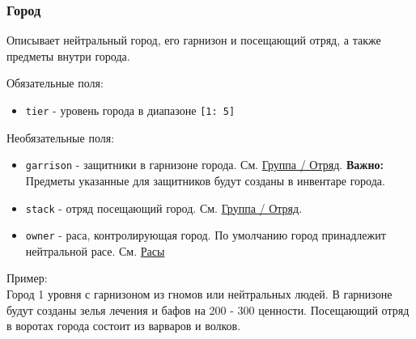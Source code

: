 \subsubsection{Город}
\label{city}
Описывает нейтральный город, его гарнизон и посещающий отряд, а также предметы внутри города.

Обязательные поля:
\begin{itemize}
\item \texttt{tier} - уровень города в диапазоне \texttt{[1: 5]}
\end{itemize}

Необязательные поля:
\begin{itemize}
\item \texttt{garrison} - защитники в гарнизоне города. См. \hyperref[group]{Группа / Отряд}. \textbf{Важно:} Предметы указанные для защитников будут созданы в инвентаре города.
\item \texttt{stack} - отряд посещающий город. См. \hyperref[group]{Группа / Отряд}.
\item \texttt{owner} - раса, контролирующая город. По умолчанию город принадлежит нейтральной расе. См. \hyperref[raceTypes]{Расы}
\end{itemize}

Пример:\\
Город 1 уровня с гарнизоном из гномов или нейтральных людей.
В гарнизоне будут созданы зелья лечения и бафов на 200 - 300 ценности.
Посещающий отряд в воротах города состоит из варваров и волков.

\begin{figure}[H]

\end{figure}